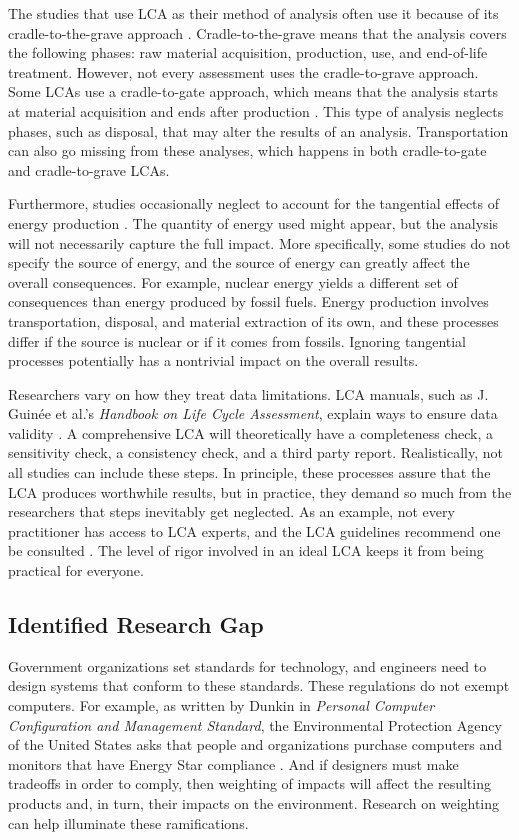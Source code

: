 \documentclass[final,journal,10pt,letterpaper,oneside,twocolumn,compsoc]%
{IEEEtran}
\begin{document}
The studies that use LCA as their method of analysis often use it because of its
cradle-to-the-grave approach \cite{14044}. Cradle-to-the-grave means that the
analysis covers the following phases: raw material acquisition, production, use,
and end-of-life treatment. However, not every assessment uses the
cradle-to-grave approach. Some LCAs use a cradle-to-gate approach, which means
that the
analysis starts at material acquisition and ends after production \cite{14040}.
This type of analysis neglects phases, such as disposal, that may alter the
results of an analysis. Transportation can also go missing from these analyses,
which happens in both cradle-to-gate and cradle-to-grave LCAs.

Furthermore, studies occasionally neglect to account for the tangential effects
of energy production \cite{maga}
\cite{client} \cite{desktop}. The quantity of energy used might appear, but
the analysis will not necessarily capture the full impact.
More specifically, some studies do not specify the source of energy, and the
source of energy can
greatly affect the overall consequences. For example, nuclear energy yields a
different set
of consequences than energy produced by fossil fuels. Energy production involves
transportation,
disposal, and material extraction of its own, and these processes differ if the
source is nuclear or if it comes from fossils. Ignoring tangential processes
potentially has a nontrivial impact on the overall results.

Researchers vary on how they treat data limitations. LCA manuals, such as J.
Guin\'{e}e et al.'s \textit{Handbook on Life Cycle Assessment}, explain
ways to ensure data validity \cite{lca} \cite{textbook}
\cite{14040} \cite{14044}. A comprehensive LCA will theoretically have a
completeness check, a sensitivity check, a consistency check, and a third party
report. Realistically, not all studies can include these steps. In
principle, these processes assure that the LCA produces worthwhile
results, but in practice, they demand so much from the researchers that
steps inevitably get neglected. As an example, not every practitioner has access
to LCA experts, and the LCA guidelines recommend one be
consulted \cite{14044}. The level of rigor involved in an ideal LCA
keeps it from being practical for everyone.

\subsection{Identified Research Gap}
Government organizations set standards for technology, and
engineers need to design systems that conform to these standards. These
regulations do not exempt computers. For example, as written by Dunkin in
\textit{Personal Computer Configuration and Management Standard}, the
Environmental Protection
Agency of the United States asks that people and organizations purchase
computers and monitors that have Energy Star
compliance \cite{epa}. And if designers must make
tradeoffs in order to comply, then weighting of impacts will affect
the resulting products and, in turn, their impacts on the environment.
Research on weighting can help illuminate these ramifications.
\end{document}

